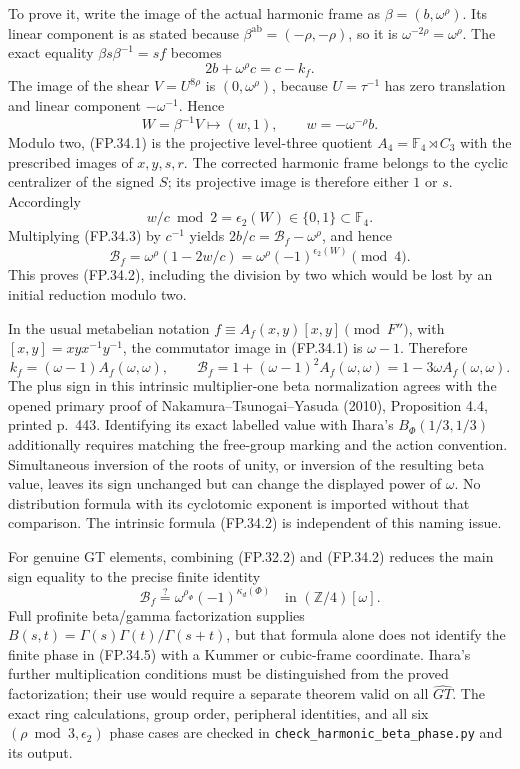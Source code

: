 To prove it, write the image of the actual harmonic frame as
$\beta=(b,\omega^\rho)$. Its linear component is as stated because
$\beta^{\mathrm{ab}}=(-\rho,-\rho)$, so it is
$\omega^{-2\rho}=\omega^\rho$. The exact equality
$\beta s\beta^{-1}=sf$ becomes
\[
 2b+\omega^\rho c=c-k_f.
 \tag{FP.34.3}
\]
The image of the shear $V=U^{8\rho}$ is $(0,\omega^\rho)$,
because $U=\tau^{-1}$ has zero translation and linear component
$-\omega^{-1}$. Hence
\[
 W=\beta^{-1}V\longmapsto(w,1),\qquad
 w=-\omega^{-\rho}b.
\]
Modulo two, (FP.34.1) is the projective level-three quotient
$A_4=\mathbb F_4\rtimes C_3$ with the prescribed images of
$x,y,s,r$. The corrected harmonic frame belongs to the cyclic
centralizer of the signed $S$; its projective image is therefore
either $1$ or $s$. Accordingly
\[
 w/c\bmod2=\epsilon_2(W)\in\{0,1\}\subset\mathbb F_4.
\]
Multiplying (FP.34.3) by $c^{-1}$ yields
$2b/c=\mathcal B_f-\omega^\rho$, and hence
\[
 \mathcal B_f=\omega^\rho(1-2w/c)
             =\omega^\rho(-1)^{\epsilon_2(W)}\pmod4.
\]
This proves (FP.34.2), including the division by two which would
be lost by an initial reduction modulo two.

In the usual metabelian notation
$f\equiv A_f(x,y)[x,y]\pmod{F''}$, with
$[x,y]=xyx^{-1}y^{-1}$, the commutator image in (FP.34.1) is
$\omega-1$. Therefore
\[
 k_f=(\omega-1)A_f(\omega,\omega),\qquad
 \mathcal B_f=1+(\omega-1)^2A_f(\omega,\omega)
            =1-3\omega A_f(\omega,\omega).
 \tag{FP.34.4}
\]
The plus sign in this intrinsic multiplier-one beta normalization
agrees with the opened primary proof of
Nakamura--Tsunogai--Yasuda (2010), Proposition 4.4, printed p.~443.
Identifying its exact labelled value with Ihara's
$B_\Phi(1/3,1/3)$ additionally requires matching the free-group
marking and the action convention. Simultaneous inversion of the
roots of unity, or inversion of the resulting beta value, leaves
its sign unchanged but can change the displayed power of $\omega$.
No distribution formula with its cyclotomic exponent is imported
without that comparison. The intrinsic formula (FP.34.2) is
independent of this naming issue.

For genuine GT elements, combining (FP.32.2) and (FP.34.2) reduces
the main sign equality to the precise finite identity
\[
 \mathcal B_f\stackrel{?}{=}
            \omega^{\rho_\Phi}(-1)^{\kappa_d(\Phi)}
 \quad\text{in }(\mathbb Z/4)[\omega].
 \tag{FP.34.5}
\]
Full profinite beta/gamma factorization supplies
$B(s,t)=\Gamma(s)\Gamma(t)/\Gamma(s+t)$, but that formula alone
does not identify the finite phase in (FP.34.5) with a Kummer or
cubic-frame coordinate. Ihara's further multiplication conditions
must be distinguished from the proved factorization; their use
would require a separate theorem valid on all $\widehat{GT}$.
The exact ring calculations, group order, peripheral identities,
and all six $(\rho\bmod3,\epsilon_2)$ phase cases are checked in
\texttt{check\_harmonic\_beta\_phase.py} and its output.

